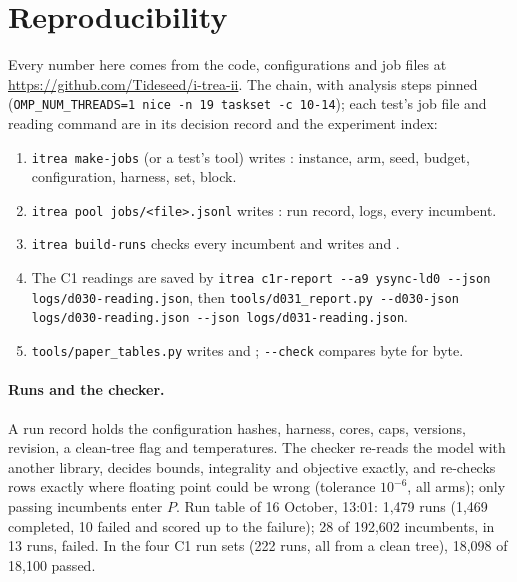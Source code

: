 \section{Reproducibility}\label{sec:repro}
Every number here comes from the code, configurations and job files at \url{https://github.com/Tideseed/i-trea-ii}.
The chain, with analysis steps pinned (\texttt{OMP\_NUM\_THREADS=1 nice -n 19 taskset -c
10-14}); each test's job file and reading command are in its decision record and the experiment index:
\begin{enumerate}\setlength{\itemsep}{0pt}\setlength{\parskip}{0pt}
\item \texttt{itrea make-jobs} (or a test's tool) writes : instance, arm, seed, budget,
  configuration, harness, set, block.
\item \texttt{itrea pool jobs/<file>.jsonl} writes : run record, logs, every
  incumbent.
\item \texttt{itrea build-runs} checks every incumbent and writes  and
  .
\item The C1 readings are saved by \texttt{itrea c1r-report -{}-a9 ysync-ld0 -{}-json logs/d030-reading.json}, then
  \texttt{tools/d031\_report.py -{}-d030-json logs/d030-reading.json -{}-json logs/d031-reading.json}.
\item \texttt{tools/paper\_tables.py} writes  and ; \texttt{-{}-check}
  compares byte for byte.
\end{enumerate}

\paragraph{Runs and the checker.} A run record holds the configuration hashes, harness, cores, caps, versions,
revision, a clean-tree flag and temperatures. The checker re-reads the model with another library, decides bounds,
integrality and objective exactly, and re-checks rows exactly where floating point could be wrong (tolerance
$10^{-6}$, all arms); only passing incumbents enter $P$. Run table of 16 October, 13:01: 1{,}479 runs (1{,}469 completed, 10 failed and scored up to the failure);
28 of 192{,}602 incumbents, in 13 runs, failed. In the four C1 run sets (222 runs, all from a clean tree), 18{,}098 of
18{,}100 passed.

